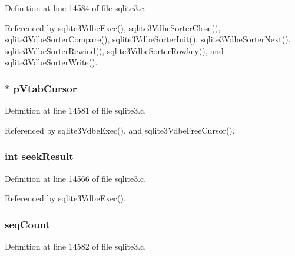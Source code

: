 Definition at line 14584 of file sqlite3.\+c.



Referenced by sqlite3\+Vdbe\+Exec(), sqlite3\+Vdbe\+Sorter\+Close(), sqlite3\+Vdbe\+Sorter\+Compare(), sqlite3\+Vdbe\+Sorter\+Init(), sqlite3\+Vdbe\+Sorter\+Next(), sqlite3\+Vdbe\+Sorter\+Rewind(), sqlite3\+Vdbe\+Sorter\+Rowkey(), and sqlite3\+Vdbe\+Sorter\+Write().

\hypertarget{struct_vdbe_cursor_ade9003fb9468196e8abfee21c6e4b914}{}
\subsubsection[{p\+Vtab\+Cursor}]{$\ast$ p\+Vtab\+Cursor}\label{struct_vdbe_cursor_ade9003fb9468196e8abfee21c6e4b914}


Definition at line 14581 of file sqlite3.\+c.



Referenced by sqlite3\+Vdbe\+Exec(), and sqlite3\+Vdbe\+Free\+Cursor().

\hypertarget{struct_vdbe_cursor_ad4a00b8dd3dc55901a7d9f7dc6b54794}{}
\subsubsection[{seek\+Result}]{\setlength{\rightskip}{0pt plus 5cm}int seek\+Result}\label{struct_vdbe_cursor_ad4a00b8dd3dc55901a7d9f7dc6b54794}


Definition at line 14566 of file sqlite3.\+c.



Referenced by sqlite3\+Vdbe\+Exec().

\hypertarget{struct_vdbe_cursor_abd2178c8ecc4c97494f90c4766b928f7}{}
\subsubsection[{seq\+Count}]{ seq\+Count}\label{struct_vdbe_cursor_abd2178c8ecc4c97494f90c4766b928f7}


Definition at line 14582 of file sqlite3.\+c.




